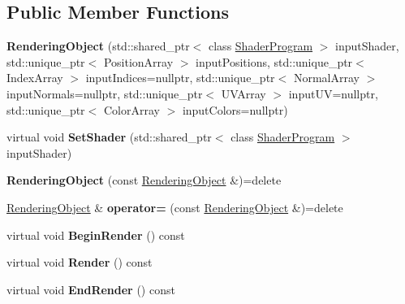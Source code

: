 \subsection*{Public Member Functions}
\begin{DoxyCompactItemize}
\item 
\hypertarget{class_rendering_object_a0550d86d49a01032921150d1c09c378f}{}{\bfseries Rendering\+Object} (std\+::shared\+\_\+ptr$<$ class \hyperlink{class_shader_program}{Shader\+Program} $>$ input\+Shader, std\+::unique\+\_\+ptr$<$ Position\+Array $>$ input\+Positions, std\+::unique\+\_\+ptr$<$ Index\+Array $>$ input\+Indices=nullptr, std\+::unique\+\_\+ptr$<$ Normal\+Array $>$ input\+Normals=nullptr, std\+::unique\+\_\+ptr$<$ U\+V\+Array $>$ input\+U\+V=nullptr, std\+::unique\+\_\+ptr$<$ Color\+Array $>$ input\+Colors=nullptr)\label{class_rendering_object_a0550d86d49a01032921150d1c09c378f}

\item 
\hypertarget{class_rendering_object_a22311d08bb7559f6b913afe314a5031e}{}virtual void {\bfseries Set\+Shader} (std\+::shared\+\_\+ptr$<$ class \hyperlink{class_shader_program}{Shader\+Program} $>$ input\+Shader)\label{class_rendering_object_a22311d08bb7559f6b913afe314a5031e}

\item 
\hypertarget{class_rendering_object_ac702ac667116929234273ecdb99cf7d6}{}{\bfseries Rendering\+Object} (const \hyperlink{class_rendering_object}{Rendering\+Object} \&)=delete\label{class_rendering_object_ac702ac667116929234273ecdb99cf7d6}

\item 
\hypertarget{class_rendering_object_ab644292ac584d1a9813e5f30ad79c4f1}{}\hyperlink{class_rendering_object}{Rendering\+Object} \& {\bfseries operator=} (const \hyperlink{class_rendering_object}{Rendering\+Object} \&)=delete\label{class_rendering_object_ab644292ac584d1a9813e5f30ad79c4f1}

\item 
\hypertarget{class_rendering_object_afa4510ba81fb7b17b940c92b27442d93}{}virtual void {\bfseries Begin\+Render} () const \label{class_rendering_object_afa4510ba81fb7b17b940c92b27442d93}

\item 
\hypertarget{class_rendering_object_a5fdb7a1b2d53b7ce024a4eeabd9c86d3}{}virtual void {\bfseries Render} () const \label{class_rendering_object_a5fdb7a1b2d53b7ce024a4eeabd9c86d3}

\item 
\hypertarget{class_rendering_object_a2a038472f934360acddd26f4e992b28b}{}virtual void {\bfseries End\+Render} () const \label{class_rendering_object_a2a038472f934360acddd26f4e992b28b}


\end{DoxyCompactItemize}

